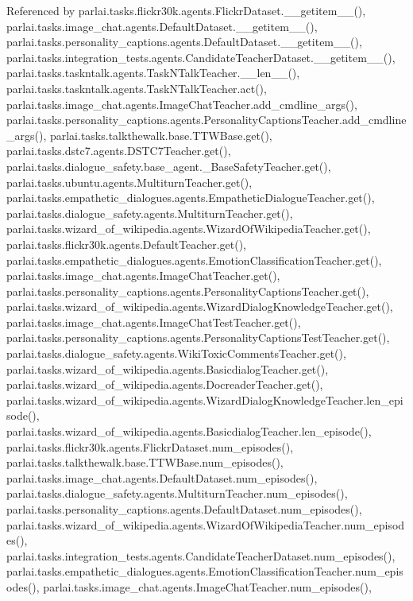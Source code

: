 Referenced by parlai.\+tasks.\+flickr30k.\+agents.\+Flickr\+Dataset.\+\_\+\+\_\+getitem\+\_\+\+\_\+(), parlai.\+tasks.\+image\+\_\+chat.\+agents.\+Default\+Dataset.\+\_\+\+\_\+getitem\+\_\+\+\_\+(), parlai.\+tasks.\+personality\+\_\+captions.\+agents.\+Default\+Dataset.\+\_\+\+\_\+getitem\+\_\+\+\_\+(), parlai.\+tasks.\+integration\+\_\+tests.\+agents.\+Candidate\+Teacher\+Dataset.\+\_\+\+\_\+getitem\+\_\+\+\_\+(), parlai.\+tasks.\+taskntalk.\+agents.\+Task\+N\+Talk\+Teacher.\+\_\+\+\_\+len\+\_\+\+\_\+(), parlai.\+tasks.\+taskntalk.\+agents.\+Task\+N\+Talk\+Teacher.\+act(), parlai.\+tasks.\+image\+\_\+chat.\+agents.\+Image\+Chat\+Teacher.\+add\+\_\+cmdline\+\_\+args(), parlai.\+tasks.\+personality\+\_\+captions.\+agents.\+Personality\+Captions\+Teacher.\+add\+\_\+cmdline\+\_\+args(), parlai.\+tasks.\+talkthewalk.\+base.\+T\+T\+W\+Base.\+get(), parlai.\+tasks.\+dstc7.\+agents.\+D\+S\+T\+C7\+Teacher.\+get(), parlai.\+tasks.\+dialogue\+\_\+safety.\+base\+\_\+agent.\+\_\+\+Base\+Safety\+Teacher.\+get(), parlai.\+tasks.\+ubuntu.\+agents.\+Multiturn\+Teacher.\+get(), parlai.\+tasks.\+empathetic\+\_\+dialogues.\+agents.\+Empathetic\+Dialogue\+Teacher.\+get(), parlai.\+tasks.\+dialogue\+\_\+safety.\+agents.\+Multiturn\+Teacher.\+get(), parlai.\+tasks.\+wizard\+\_\+of\+\_\+wikipedia.\+agents.\+Wizard\+Of\+Wikipedia\+Teacher.\+get(), parlai.\+tasks.\+flickr30k.\+agents.\+Default\+Teacher.\+get(), parlai.\+tasks.\+empathetic\+\_\+dialogues.\+agents.\+Emotion\+Classification\+Teacher.\+get(), parlai.\+tasks.\+image\+\_\+chat.\+agents.\+Image\+Chat\+Teacher.\+get(), parlai.\+tasks.\+personality\+\_\+captions.\+agents.\+Personality\+Captions\+Teacher.\+get(), parlai.\+tasks.\+wizard\+\_\+of\+\_\+wikipedia.\+agents.\+Wizard\+Dialog\+Knowledge\+Teacher.\+get(), parlai.\+tasks.\+image\+\_\+chat.\+agents.\+Image\+Chat\+Test\+Teacher.\+get(), parlai.\+tasks.\+personality\+\_\+captions.\+agents.\+Personality\+Captions\+Test\+Teacher.\+get(), parlai.\+tasks.\+dialogue\+\_\+safety.\+agents.\+Wiki\+Toxic\+Comments\+Teacher.\+get(), parlai.\+tasks.\+wizard\+\_\+of\+\_\+wikipedia.\+agents.\+Basicdialog\+Teacher.\+get(), parlai.\+tasks.\+wizard\+\_\+of\+\_\+wikipedia.\+agents.\+Docreader\+Teacher.\+get(), parlai.\+tasks.\+wizard\+\_\+of\+\_\+wikipedia.\+agents.\+Wizard\+Dialog\+Knowledge\+Teacher.\+len\+\_\+episode(), parlai.\+tasks.\+wizard\+\_\+of\+\_\+wikipedia.\+agents.\+Basicdialog\+Teacher.\+len\+\_\+episode(), parlai.\+tasks.\+flickr30k.\+agents.\+Flickr\+Dataset.\+num\+\_\+episodes(), parlai.\+tasks.\+talkthewalk.\+base.\+T\+T\+W\+Base.\+num\+\_\+episodes(), parlai.\+tasks.\+image\+\_\+chat.\+agents.\+Default\+Dataset.\+num\+\_\+episodes(), parlai.\+tasks.\+dialogue\+\_\+safety.\+agents.\+Multiturn\+Teacher.\+num\+\_\+episodes(), parlai.\+tasks.\+personality\+\_\+captions.\+agents.\+Default\+Dataset.\+num\+\_\+episodes(), parlai.\+tasks.\+wizard\+\_\+of\+\_\+wikipedia.\+agents.\+Wizard\+Of\+Wikipedia\+Teacher.\+num\+\_\+episodes(), parlai.\+tasks.\+integration\+\_\+tests.\+agents.\+Candidate\+Teacher\+Dataset.\+num\+\_\+episodes(), parlai.\+tasks.\+empathetic\+\_\+dialogues.\+agents.\+Emotion\+Classification\+Teacher.\+num\+\_\+episodes(), parlai.\+tasks.\+image\+\_\+chat.\+agents.\+Image\+Chat\+Teacher.\+num\+\_\+episodes(), 